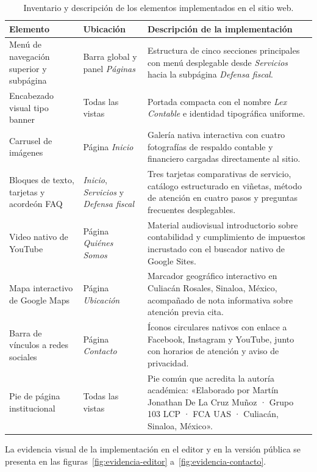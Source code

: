 {\begin{table}[htbp]
\centering
\caption{Inventario y descripción de los elementos implementados en el sitio web.}
\label{tab:elementos-sitio}
\small
\begin{tabularx}{\textwidth}{@{}>{\raggedright\arraybackslash}p{4.2cm}>{\raggedright\arraybackslash}p{3.0cm}X@{}}
\toprule
\textbf{Elemento} & \textbf{Ubicación} & \textbf{Descripción de la implementación} \\
\midrule
Menú de navegación superior y subpágina & Barra global y panel \emph{Páginas} & Estructura de cinco secciones principales con menú desplegable desde \emph{Servicios} hacia la subpágina \emph{Defensa fiscal}. \\
Encabezado visual tipo banner & Todas las vistas & Portada compacta con el nombre \emph{Lex Contable} e identidad tipográfica uniforme. \\
Carrusel de imágenes & Página \emph{Inicio} & Galería nativa interactiva con cuatro fotografías de respaldo contable y financiero cargadas directamente al sitio. \\
Bloques de texto, tarjetas y acordeón FAQ & \emph{Inicio}, \emph{Servicios} y \emph{Defensa fiscal} & Tres tarjetas comparativas de servicio, catálogo estructurado en viñetas, método de atención en cuatro pasos y preguntas frecuentes desplegables. \\
Video nativo de YouTube & Página \emph{Quiénes Somos} & Material audiovisual introductorio sobre contabilidad y cumplimiento de impuestos incrustado con el buscador nativo de Google Sites. \\
Mapa interactivo de Google Maps & Página \emph{Ubicación} & Marcador geográfico interactivo en Culiacán Rosales, Sinaloa, México, acompañado de nota informativa sobre atención previa cita. \\
Barra de vínculos a redes sociales & Página \emph{Contacto} & Íconos circulares nativos con enlace a Facebook, Instagram y YouTube, junto con horarios de atención y aviso de privacidad. \\
Pie de página institucional & Todas las vistas & Pie común que acredita la autoría académica: «Elaborado por Martín Jonathan De La Cruz Muñoz · Grupo 103 LCP · FCA UAS · Culiacán, Sinaloa, México». \\
\bottomrule
\end{tabularx}
\end{table}

La evidencia visual de la implementación en el editor y en la versión pública se presenta en las figuras~\ref{fig:evidencia-editor} a~\ref{fig:evidencia-contacto}.

}
